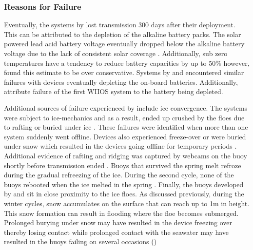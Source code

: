 \subsubsection{Reasons for Failure}
\label{ch2:sec3_failiure}

Eventually, the systems by \textcite{doble2017robust} lost transmission 300 days after their deployment. This can be attributed to the depletion of the alkaline battery packs. The solar powered lead acid battery voltage eventually dropped below the alkaline battery voltage due to the lack of consistent solar coverage \cite{doble2017robust}. Additionally, sub zero temperatures have a tendency to reduce battery capacities by up to 50\% \cite{doble2017robust} however, \textcite{doble2017robust} found this estimate to be over conservative. Systems by \textcite{kohout2015device} and \textcite{doble2017robust} encountered similar failures with devices eventually depleting the on-board batteries. Additionally, \cite{alberello2019drift} attribute failure of the first WIIOS system to the battery being depleted.\par 

Additional sources of failure experienced by \textcite{doble2017robust} include ice convergence. The systems were subject to ice-mechanics and as a result, ended up crushed by the floes due to rafting or buried under ice \textcite{doble2017robust}. These failures were identified when more than one system suddenly went offline. Devices also experienced freeze-over or were buried under snow which resulted in the devices going offline for temporary periods \cite{doble2017robust}. Additional evidence of rafting and ridging was captured by webcams on the buoy shortly before transmission ended \cite{doble2017robust}. Buoys that survived the spring melt refroze during the gradual refreezing of the ice. During the second cycle, none of the buoys rebooted when the ice melted in the spring \cite{doble2017robust}. Finally, the buoys developed by \textcite{kohout2015device} and \textcite{rabault2017measurements} sit in close proximity to the ice floes. As discussed previously, during the winter cycles, snow accumulates on the surface that can reach up to 1m in height. This snow formation can result in flooding where the floe becomes submerged. Prolonged burying under snow may have resulted in the device freezing over thereby losing contact while prolonged contact with the seawater may have resulted in the buoys failing on several occasions (\cite{kohout2015device,vichi2019effects,albarello2020drift,rabault2019open})\par 

